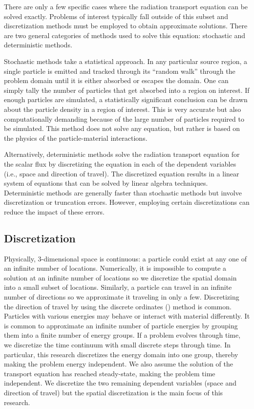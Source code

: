\documentclass{article}
\begin{document}
There are only a few specific cases where the radiation transport equation can be solved exactly. Problems of interest typically fall outside of this subset and discretization methods must be employed to obtain approximate solutions. There are two general categories of methods used to solve this equation: stochastic and deterministic methods.

Stochastic methods take a statistical approach. In any particular source region, a single particle is emitted and tracked through its ``random walk'' through the problem domain until it is either absorbed or escapes the domain. One can simply tally the number of particles that get absorbed into a region on interest. If enough particles are simulated, a statistically significant conclusion can be drawn about the particle density in a region of interest. This is very accurate but also computationally demanding because of the large number of particles required to be simulated. This method does not solve any equation, but rather is based on the physics of the particle-material interactions.

Alternatively, deterministic methods solve the radiation transport equation for the scalar flux by discretizing the equation in each of the dependent variables (i.e., space and direction of travel). The discretized equation results in a linear system of equations that can be solved by linear algebra techniques. Deterministic methods are generally faster than stochastic methods but involve discretization or truncation errors. However, employing certain discretizations can reduce the impact of these errors.

\subsection{Discretization}
\label{sec:DiscretizationIntro}

Physically, 3-dimensional space is continuous: a particle could exist at any one of an infinite number of locations. Numerically, it is impossible to compute a solution at an infinite number of locations so we discretize the spatial domain into a small subset of locations. Similarly, a particle can travel in an infinite number of directions so we approximate it traveling in only a few. Discretizing the direction of travel by using the discrete ordinates (\SN) method \cite{discrete_ordinates} is common. Particles with various energies may behave or interact with material differently. It is common to approximate an infinite number of particle energies by grouping them into a finite number of energy groups. If a problem evolves through time, we discretize the time continuum with small discrete steps through time. In particular, this research discretizes the energy domain into one group, thereby making the problem energy independent. We also assume the solution of the transport equation has reached steady-state, making the problem time independent. We discretize the two remaining dependent variables (space and direction of travel) but the spatial discretization is the main focus of this research.
\end{document}
